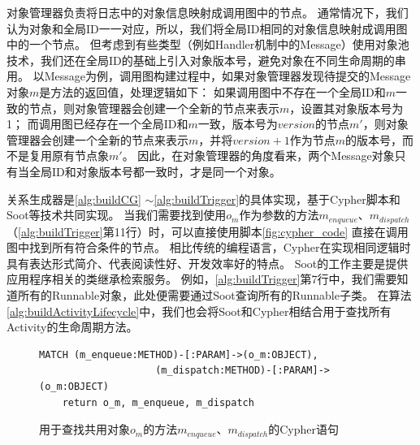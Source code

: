

对象管理器负责将日志中的对象信息映射成调用图中的节点。
通常情况下，我们认为对象和全局ID一一对应，所以，我们将全局ID相同的对象信息映射成调用图中的一个节点。
但考虑到有些类型（例如Handler机制中的Message）使用对象池技术，我们还在全局ID的基础上引入对象版本号，避免对象在不同生命周期的串用。
以Message为例，调用图构建过程中，如果对象管理器发现待提交的Message对象$m$是方法的返回值，处理逻辑如下：
如果调用图中不存在一个全局ID和$m$一致的节点，则对象管理器会创建一个全新的节点来表示$m$，设置其对象版本号为1；
而调用图已经存在一个全局ID和$m$一致，版本号为$version$的节点$m'$，则对象管理器会创建一个全新的节点来表示$m$，并将$version + 1$作为节点$m$的版本号，而不是复用原有节点象$m'$。
因此，在对象管理器的角度看来，两个Message对象只有当全局ID和对象版本号都一致时，才是同一个对象。



关系生成器是\autoref{alg:buildCG} $\sim$\autoref{alg:buildTrigger}的具体实现，基于Cypher脚本和Soot等技术共同实现。
当我们需要找到使用$o_{m}$作为参数的方法$m_{enqueue}$、$m_{dispatch}$（\autoref{alg:buildTrigger}第11行）时，可以直接使用脚本\autoref{fig:cypher_code}
直接在调用图中找到所有符合条件的节点。
相比传统的编程语言，Cypher在实现相同逻辑时具有表达形式简介、代表阅读性好、开发效率好的特点。
Soot的工作主要是提供应用程序相关的类继承检索服务。
例如，\autoref{alg:buildTrigger}第7行中，我们需要知道所有的Runnable对象，此处便需要通过Soot查询所有的Runnable子类。
在算法\ref{alg:buildActivityLifecycle}中，我们也会将Soot和Cypher相结合用于查找所有Activity的生命周期方法。


\begin{figure}[!h]
	\centering
	\begin{lstlisting}[style=normal,language=cypher]
	MATCH (m_enqueue:METHOD)-[:PARAM]->(o_m:OBJECT),
					(m_dispatch:METHOD)-[:PARAM]->(o_m:OBJECT)
	return o_m, m_enqueue, m_dispatch\end{lstlisting}
	\caption{用于查找共用对象$o_m$的方法$m_{enqueue}$、$m_{dispatch}$的Cypher语句}
	\label{fig:cypher_code}
\end{figure}


